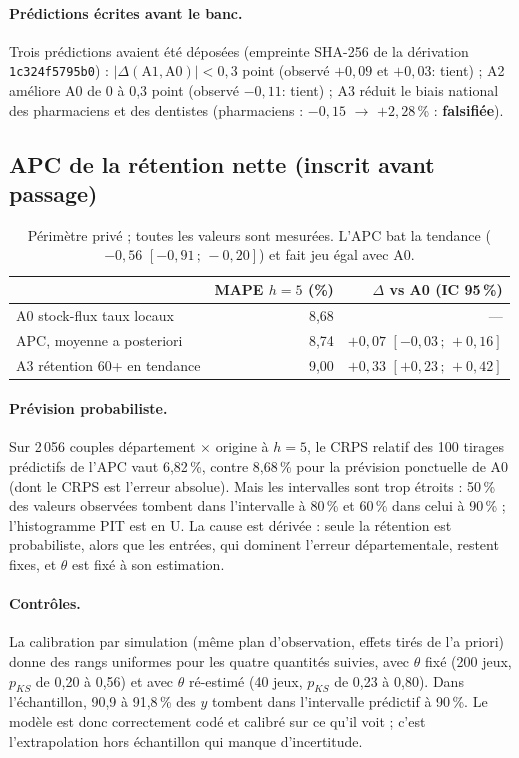 \documentclass[11pt]{article}
\begin{document}
\paragraph{Prédictions écrites avant le banc.} Trois prédictions avaient été déposées
(empreinte SHA-256 de la dérivation \texttt{1c324f5795b0}) :
$|\Delta(\text{A1}, \text{A0})| < 0{,}3$ point (observé $+0{,}09$ et $+0{,}03$\mesure : tient) ;
A2 améliore A0 de 0 à 0,3 point (observé $-0{,}11$\mesure : tient) ;
A3 réduit le biais national des pharmaciens et des dentistes (pharmaciens : $-0{,}15$ $\to$
$+2{,}28$\,\%\mesure{} : \textbf{falsifiée}).

\subsection{APC de la rétention nette (inscrit avant passage)}
\begin{table}[h]
\centering\small
\begin{tabular}{@{}lrr@{}}
\toprule
& MAPE $h=5$ (\%) & $\Delta$ vs A0 (IC 95\,\%) \\
\midrule
A0 stock-flux taux locaux & 8,68 & --- \\
APC, moyenne a posteriori & 8,74 & $+0{,}07$ $[-0{,}03\,;\,+0{,}16]$ \\
A3 rétention 60+ en tendance & 9,00 & $+0{,}33$ $[+0{,}23\,;\,+0{,}42]$ \\
\bottomrule
\end{tabular}
\caption{Périmètre privé ; toutes les valeurs sont mesurées\mesure. L'APC bat la tendance
($-0{,}56$ $[-0{,}91\,;\,-0{,}20]$\mesure) et fait jeu égal avec A0.}
\end{table}

\paragraph{Prévision probabiliste.} Sur 2\,056 couples département $\times$ origine à $h = 5$, le CRPS
relatif des 100 tirages prédictifs de l'APC vaut 6,82\,\%\mesure, contre 8,68\,\%\mesure{} pour la
prévision ponctuelle de A0 (dont le CRPS est l'erreur absolue). Mais les intervalles sont trop
étroits : 50\,\%\mesure{} des valeurs observées tombent dans l'intervalle à 80\,\% et 60\,\%\mesure{}
dans celui à 90\,\% ; l'histogramme PIT est en U. La cause est dérivée\derive{} : seule la rétention
est probabiliste, alors que les entrées, qui dominent l'erreur départementale, restent fixes, et
$\theta$ est fixé à son estimation.

\paragraph{Contrôles.} La calibration par simulation (même plan d'observation, effets tirés de l'a
priori) donne des rangs uniformes pour les quatre quantités suivies, avec $\theta$ fixé (200 jeux,
$p_{KS}$ de 0,20 à 0,56\mesure) et avec $\theta$ ré-estimé (40 jeux, $p_{KS}$ de 0,23 à
0,80\mesure). Dans l'échantillon, 90,9 à 91,8\,\%\mesure{} des $y$ tombent dans l'intervalle
prédictif à 90\,\%. Le modèle est donc correctement codé et calibré sur ce qu'il voit ; c'est
l'extrapolation hors échantillon qui manque d'incertitude.
\end{document}
